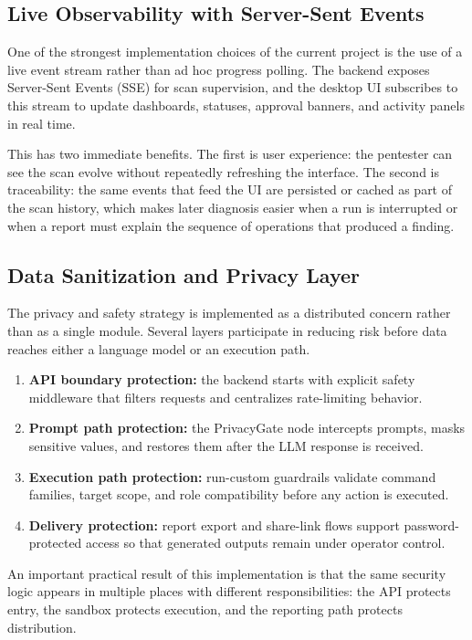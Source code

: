 \documentclass[12pt,a4paper]{report}
\begin{document}
\subsection{Live Observability with Server-Sent Events}

One of the strongest implementation choices of the current project is the use of a
live event stream rather than ad hoc progress polling. The backend exposes
Server-Sent Events (SSE) for scan supervision, and the desktop UI subscribes to this
stream to update dashboards, statuses, approval banners, and activity panels in real
time.

This has two immediate benefits. The first is user experience: the pentester can see
the scan evolve without repeatedly refreshing the interface. The second is
traceability: the same events that feed the UI are persisted or cached as part of the
scan history, which makes later diagnosis easier when a run is interrupted or when a
report must explain the sequence of operations that produced a finding.

\subsection{Data Sanitization and Privacy Layer}

The privacy and safety strategy is implemented as a distributed concern rather than
as a single module. Several layers participate in reducing risk before data reaches
either a language model or an execution path.

\begin{enumerate}
    \item \textbf{API boundary protection:} the backend starts with explicit safety
    middleware that filters requests and centralizes rate-limiting behavior.
    \item \textbf{Prompt path protection:} the PrivacyGate node intercepts prompts,
    masks sensitive values, and restores them after the LLM response is received.
    \item \textbf{Execution path protection:} run-custom guardrails validate command
    families, target scope, and role compatibility before any action is executed.
    \item \textbf{Delivery protection:} report export and share-link flows support
    password-protected access so that generated outputs remain under operator control.
\end{enumerate}

An important practical result of this implementation is that the same security logic
appears in multiple places with different responsibilities: the API protects entry,
the sandbox protects execution, and the reporting path protects distribution.
\end{document}
